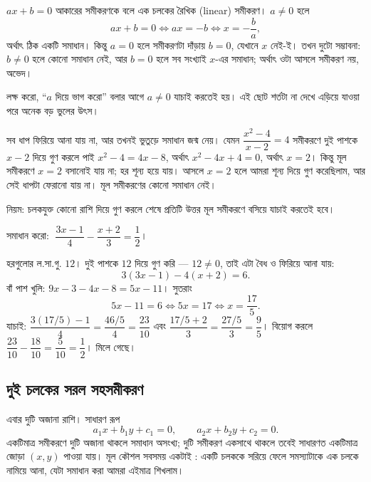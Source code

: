 \documentclass[11pt]{article}
\begin{document}
\begin{idea}[রৈখিক সমীকরণ]
$ax + b = 0$ আকারের সমীকরণকে বলে এক চলকের রৈখিক (linear) সমীকরণ। $a \neq 0$ হলে
\[
  ax + b = 0 \iff ax = -b \iff x = -\frac{b}{a},
\]
অর্থাৎ ঠিক একটি সমাধান। কিন্তু $a = 0$ হলে সমীকরণটা দাঁড়ায় $b = 0$, যেখানে $x$
নেই-ই। তখন দুটো সম্ভাবনা: $b \neq 0$ হলে কোনো সমাধান নেই, আর $b = 0$ হলে
সব সংখ্যাই $x$-এর সমাধান; অর্থাৎ ওটা আসলে সমীকরণ নয়, অভেদ।

লক্ষ করো, ``$a$ দিয়ে ভাগ করো'' বলার আগে $a \neq 0$ যাচাই করতেই হয়। এই ছোট
শর্তটা না দেখে এড়িয়ে যাওয়া পরে অনেক বড় ভুলের উৎস।
\end{idea}

\begin{remark}
সব ধাপ ফিরিয়ে আনা যায় না, আর তখনই ভুতুড়ে সমাধান জন্ম নেয়। যেমন
$\dfrac{x^{2}-4}{x-2} = 4$ সমীকরণে দুই পাশকে $x - 2$ দিয়ে গুণ করলে পাই
$x^{2} - 4 = 4x - 8$, অর্থাৎ $x^{2} - 4x + 4 = 0$, অর্থাৎ $x = 2$। কিন্তু মূল
সমীকরণে $x = 2$ বসানোই যায় না; হর শূন্য হয়ে যায়। আসলে $x = 2$ হলে আমরা শূন্য
দিয়ে গুণ করেছিলাম, আর সেই ধাপটা ফেরানো যায় না। মূল সমীকরণের কোনো সমাধান নেই।

নিয়ম: চলকযুক্ত কোনো রাশি দিয়ে গুণ করলে শেষে প্রতিটি উত্তর মূল সমীকরণে বসিয়ে
যাচাই করতেই হবে।
\end{remark}

\begin{example}
সমাধান করো: $\;\dfrac{3x - 1}{4} - \dfrac{x + 2}{3} = \dfrac{1}{2}$।
\end{example}

\begin{solbox}
হরগুলোর ল.সা.গু. $12$। দুই পাশকে $12$ দিয়ে গুণ করি --- $12 \neq 0$, তাই এটা
বৈধ ও ফিরিয়ে আনা যায়:
\[
  3(3x - 1) - 4(x + 2) = 6 .
\]
বাঁ পাশ খুলি: $9x - 3 - 4x - 8 = 5x - 11$। সুতরাং
\[
  5x - 11 = 6 \iff 5x = 17 \iff x = \frac{17}{5} .
\]
যাচাই: $\dfrac{3(17/5) - 1}{4} = \dfrac{46/5}{4} = \dfrac{23}{10}$ এবং
$\dfrac{17/5 + 2}{3} = \dfrac{27/5}{3} = \dfrac{9}{5}$। বিয়োগ করলে
$\dfrac{23}{10} - \dfrac{18}{10} = \dfrac{5}{10} = \dfrac{1}{2}$। মিলে গেছে।
\end{solbox}

\subsection*{দুই চলকের সরল সহসমীকরণ}

\noindent
এবার দুটি অজানা রাশি। সাধারণ রূপ
\[
  a_1 x + b_1 y + c_1 = 0, \qquad a_2 x + b_2 y + c_2 = 0 .
\]
একটিমাত্র সমীকরণে দুটি অজানা থাকলে সমাধান অসংখ্য; দুটি সমীকরণ একসাথে থাকলে তবেই
সাধারণত একটিমাত্র জোড়া $(x, y)$ পাওয়া যায়। মূল কৌশল সবসময় একটাই : একটি চলককে
সরিয়ে ফেলে সমস্যাটাকে এক চলকে নামিয়ে আনা, যেটা সমাধান করা আমরা এইমাত্র শিখলাম।
\end{document}
